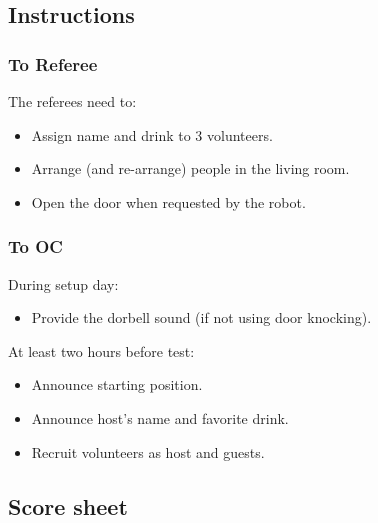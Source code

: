 \subsection*{Instructions}

\subsubsection*{To Referee}

The referees need to:
\begin{itemize}
	\item Assign name and drink to 3 volunteers.
	\item Arrange (and re-arrange) people in the living room.
	\item Open the door when requested by the robot.
\end{itemize}

\subsubsection*{To OC}

During setup day:
\begin{itemize}
	\item Provide the dorbell sound (if not using door knocking).
\end{itemize}

At least two hours before test:
\begin{itemize}
	\item Announce starting position.
	\item Announce host's name and favorite drink.
	\item Recruit volunteers as host and guests.
\end{itemize}

\subsection*{Score sheet}


